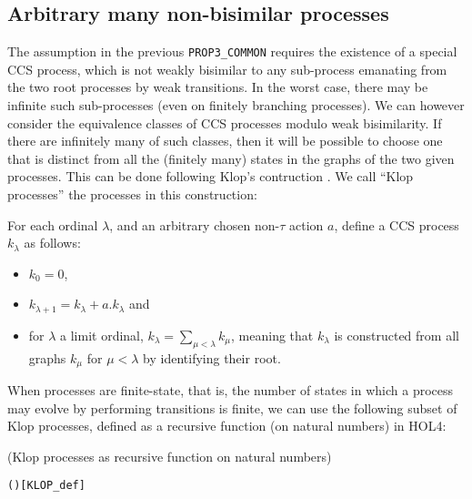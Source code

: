 \subsection{Arbitrary many non-bisimilar processes}

The assumption in the  previous \texttt{PROP3_COMMON} requires the
existence of a special CCS process, which is not weakly bisimilar to
any sub-process emanating from the two root processes by weak
transitions. In the worst case, there may be infinite such
sub-processes (even on finitely branching processes).
We can however consider  the equivalence classes of CCS processes 
modulo weak bisimilarity.
If there are infinitely many of such classes, 
then it will be 
possible to choose one  that is distinct from all the (finitely many) states in the
graphs of the two given processes.  
This can be done following Klop's contruction \cite{van2005characterisation}.
 We call  ``Klop processes''  the processes in this construction:
\begin{definition}
For each ordinal $\lambda$, and an arbitrary chosen non-$\tau$ action $a$,
define a CCS process $k_\lambda$ as follows:
\begin{itemize}
\item $k_0 = 0$,
\item $k_{\lambda+1} = k_\lambda + a.k_\lambda$ and
\item for $\lambda$ a limit ordinal, $k_\lambda = \sum_{\mu < \lambda}
  k_\mu$, meaning that $k_\lambda$ is constructed from all graphs
  $k_\mu$ for $\mu < \lambda$ by identifying their root.
\end{itemize}
\end{definition}
When processes are finite-state, that is,
the number of  states in which a process may evolve by performing
transitions is finite, 
we can use  the following subset of Klop processes, 
defined as a recursive function (on natural numbers) in HOL4:
\begin{definition}{(Klop processes as recursive function on natural numbers)}
\begin{alltt}
   \HOLSymConst{\HOLTokenDefEquality{}} 
  ( ) \HOLSymConst{\HOLTokenDefEquality{}}    \HOLSymConst{\ensuremath{+}}    \hfill{[KLOP_def]}
\end{alltt}
\end{definition}

